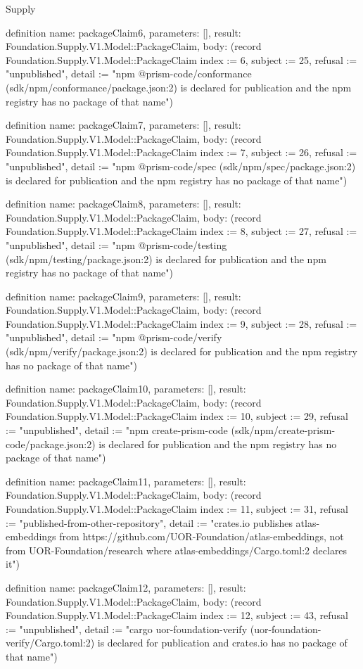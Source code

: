 \begin{lexlean}{Supply}
\begin{semanticmodule}
definition{
  name: packageClaim6,
  parameters: [],
  result: Foundation.Supply.V1.Model::PackageClaim,
  body: (record Foundation.Supply.V1.Model::PackageClaim {index := 6, subject := 25, refusal := "unpublished", detail := "npm @prism-code/conformance (sdk/npm/conformance/package.json:2) is declared for publication and the npm registry has no package of that name"})
}

definition{
  name: packageClaim7,
  parameters: [],
  result: Foundation.Supply.V1.Model::PackageClaim,
  body: (record Foundation.Supply.V1.Model::PackageClaim {index := 7, subject := 26, refusal := "unpublished", detail := "npm @prism-code/spec (sdk/npm/spec/package.json:2) is declared for publication and the npm registry has no package of that name"})
}

definition{
  name: packageClaim8,
  parameters: [],
  result: Foundation.Supply.V1.Model::PackageClaim,
  body: (record Foundation.Supply.V1.Model::PackageClaim {index := 8, subject := 27, refusal := "unpublished", detail := "npm @prism-code/testing (sdk/npm/testing/package.json:2) is declared for publication and the npm registry has no package of that name"})
}

definition{
  name: packageClaim9,
  parameters: [],
  result: Foundation.Supply.V1.Model::PackageClaim,
  body: (record Foundation.Supply.V1.Model::PackageClaim {index := 9, subject := 28, refusal := "unpublished", detail := "npm @prism-code/verify (sdk/npm/verify/package.json:2) is declared for publication and the npm registry has no package of that name"})
}

definition{
  name: packageClaim10,
  parameters: [],
  result: Foundation.Supply.V1.Model::PackageClaim,
  body: (record Foundation.Supply.V1.Model::PackageClaim {index := 10, subject := 29, refusal := "unpublished", detail := "npm create-prism-code (sdk/npm/create-prism-code/package.json:2) is declared for publication and the npm registry has no package of that name"})
}

definition{
  name: packageClaim11,
  parameters: [],
  result: Foundation.Supply.V1.Model::PackageClaim,
  body: (record Foundation.Supply.V1.Model::PackageClaim {index := 11, subject := 31, refusal := "published-from-other-repository", detail := "crates.io publishes atlas-embeddings from https://github.com/UOR-Foundation/atlas-embeddings, not from UOR-Foundation/research where atlas-embeddings/Cargo.toml:2 declares it"})
}

definition{
  name: packageClaim12,
  parameters: [],
  result: Foundation.Supply.V1.Model::PackageClaim,
  body: (record Foundation.Supply.V1.Model::PackageClaim {index := 12, subject := 43, refusal := "unpublished", detail := "cargo uor-foundation-verify (uor-foundation-verify/Cargo.toml:2) is declared for publication and crates.io has no package of that name"})
}


\end{semanticmodule}
\end{lexlean}
